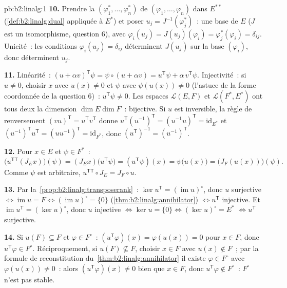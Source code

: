 \begin{solution}{pb:b2:linalg:1}
\textbf{10.} Prendre la  $(\varphi_1^*, \dots,
\varphi_n^*)$ de $(\varphi_1, \dots, \varphi_n)$ dans $E^{**}$
(\cref{def:b2:linalg:dual} appliquée à $E^*$) et poser $u_j =
J^{-1}(\varphi_j^*)$~: une base de $E$ ($J$ est un isomorphisme,
question 6), avec $\varphi_i(u_j) = J(u_j)(\varphi_i) =
\varphi_j^*(\varphi_i) = \delta_{ij}$. Unicité~: les conditions
$\varphi_i(u_j) = \delta_{ij}$ déterminent $J(u_j)$ sur la base
$(\varphi_i)$, donc déterminent $u_j$.

\textbf{11.} Linéarité~: $(u + \alpha v)^{\mathsf T}\psi = \psi
\circ (u + \alpha v) = u^{\mathsf T}\psi + \alpha\, v^{\mathsf
T}\psi$. Injectivité~: si $u \neq 0$, choisir $x$ avec $u(x) \neq 0$
et $\psi$ avec $\psi(u(x)) \neq 0$ (l'astuce de la forme coordonnée de
la question 6)~: $u^{\mathsf T}\psi \neq 0$. Les espaces $\mathcal{L}(E,F)$
et $\mathcal{L}(F^*, E^*)$ ont tous deux la dimension $\dim E \dim F$~:
bijective. Si $u$ est inversible, la règle de renversement $(vu)^{\mathsf
T} = u^{\mathsf T}v^{\mathsf T}$ donne $u^{\mathsf
T}(u^{-1})^{\mathsf T} = (u^{-1}u)^{\mathsf T} =
\mathrm{id}_{E^*}$ et $(u^{-1})^{\mathsf T}u^{\mathsf T} =
(uu^{-1})^{\mathsf T} = \mathrm{id}_{F^*}$, donc $(u^{\mathsf
T})^{-1} = (u^{-1})^{\mathsf T}$.

\textbf{12.} Pour $x \in E$ et $\psi \in F^*$~:
\[
\bigl(u^{\mathsf T\mathsf T}(J_E x)\bigr)(\psi)
= (J_E x)\bigl(u^{\mathsf T}\psi\bigr)
= (u^{\mathsf T}\psi)(x)
= \psi\bigl(u(x)\bigr)
= \bigl(J_F(u(x))\bigr)(\psi).
\]
Comme $\psi$ est arbitraire, $u^{\mathsf T\mathsf T} \circ J_E = J_F
\circ u$.

\textbf{13.} Par la~\cref{prop:b2:linalg:transposerank}~: $\ker
u^{\mathsf T} = (\operatorname{im} u)^\circ$, donc $u$ surjective
$\iff \operatorname{im} u = F \iff (\operatorname{im}u)^\circ =
\{0\}$ (\cref{thm:b2:linalg:annihilator}) $\iff u^{\mathsf T}$
injective. Et $\operatorname{im} u^{\mathsf T} = (\ker
u)^\circ$, donc $u$ injective $\iff \ker u = \{0\} \iff (\ker
u)^\circ = E^*$ $\iff u^{\mathsf T}$ surjective.

\textbf{14.} Si $u(F) \subseteq F$ et $\varphi \in F^\circ$~:
$(u^{\mathsf T}\varphi)(x) = \varphi(u(x)) = 0$ pour $x \in F$, donc
$u^{\mathsf T}\varphi \in F^\circ$. Réciproquement, si $u(F)
\not\subseteq F$, choisir $x \in F$ avec $u(x) \notin F$~; par la
formule de reconstitution du~\cref{thm:b2:linalg:annihilator} il existe
$\varphi \in F^\circ$ avec $\varphi(u(x)) \neq 0$~: alors
$(u^{\mathsf T}\varphi)(x) \neq 0$ bien que $x \in F$, donc
$u^{\mathsf T}\varphi \notin F^\circ$~: $F^\circ$ n'est pas stable.


\end{solution}
